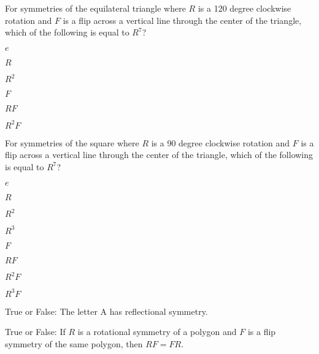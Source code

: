 \documentclass{../ximera}
\author{Claire Merriman}
\begin{document}
\maketitle

\begin{exercise} For symmetries of the equilateral triangle where
$R$ is a 120 degree clockwise rotation and
$F$ is a flip across a vertical line through the center of the triangle, which of the following is equal to $R^7$?

\begin{enumerate}
 
\begin{multicols}{2}
 \item $e$
 \item $R$
 \item $R^2$ 
 \item $F$
 \item $RF$
 \item $R^2F$
\end{multicols}
\end{enumerate}
\end{exercise}

\begin{exercise}For symmetries of the square where
$R$ is a 90 degree clockwise rotation and
$F$ is a flip across a vertical line through the center of the triangle, which of the following is equal to $R^7$?

\begin{enumerate}
 
\begin{multicols}{2}
 \item $e$
 \item $R$
 \item $R^2$ 
 \item $R^3$
 \item $F$
 \item $RF$
 \item $R^2F$
 \item $R^3F$
\end{multicols}
\end{enumerate}

\end{exercise}

\begin{exercise} True or False: The letter A has reflectional symmetry.
\end{exercise}

\begin{exercise} True or False:
If $R$ is a rotational symmetry of a polygon and $F$ is a flip symmetry of the same polygon, then $RF=FR$.
\end{exercise}



\end{document}
